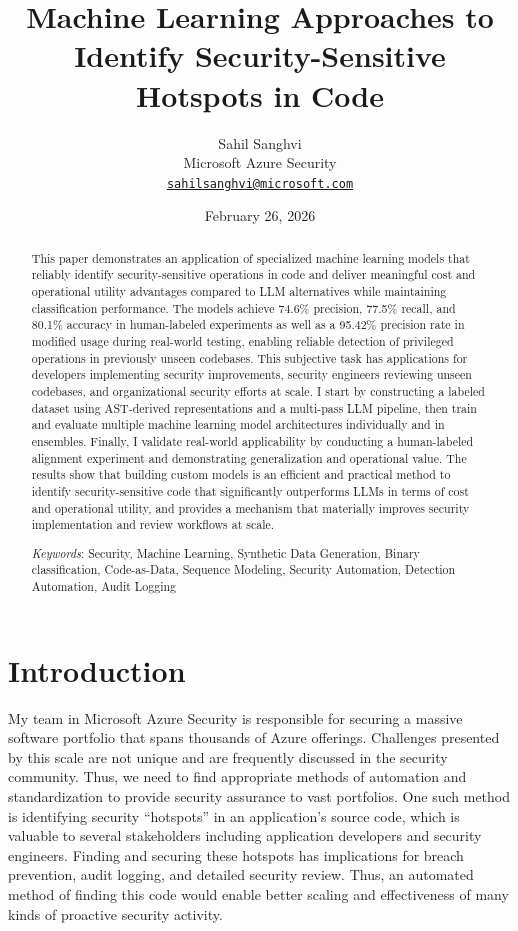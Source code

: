 \documentclass[11pt]{article}
\title{Machine Learning Approaches to Identify Security-Sensitive Hotspots in Code}
\author{
  Sahil Sanghvi\\
  {\small Microsoft Azure Security}\\
  {\small \href{mailto:sahilsanghvi@microsoft.com}{\texttt{sahilsanghvi@microsoft.com}}}
}
\date{February 26, 2026}
\begin{document}
\maketitle

\begin{abstract}

This paper demonstrates an application of specialized machine learning
models that reliably identify security-sensitive operations in code and
deliver meaningful cost and operational utility advantages compared to LLM alternatives 
while maintaining classification performance.
The models achieve 74.6\% precision, 77.5\% recall, and 80.1\%
accuracy in human-labeled experiments as well as a 95.42\% precision rate in
modified usage during real-world testing, enabling reliable detection of
privileged operations in previously unseen codebases. This subjective
task has applications for developers implementing security improvements,
security engineers reviewing unseen codebases, and organizational
security efforts at scale. I start by constructing a labeled dataset
using AST-derived representations and a multi-pass LLM pipeline, then
train and evaluate multiple machine learning model architectures
individually and in ensembles. Finally, I validate real-world
applicability by conducting a human-labeled alignment experiment and
demonstrating generalization and operational value. The results
show that building custom models is an efficient and practical method to
identify security-sensitive code that significantly outperforms LLMs in terms of
cost and operational utility, and provides a mechanism that materially improves
security implementation and review workflows at scale.

\noindent

\emph{Keywords}: Security, Machine Learning, Synthetic Data Generation,
Binary classification, Code-as-Data, Sequence Modeling, Security
Automation, Detection Automation, Audit Logging

\end{abstract}

\section{Introduction}\label{introduction}

My team in Microsoft Azure Security is responsible for securing a massive 
software portfolio that spans thousands of Azure offerings. 
Challenges presented by this scale are not unique and are frequently discussed 
in the security community. Thus, we need to find appropriate
methods of automation and standardization to provide security assurance
to vast portfolios. One such method is identifying security ``hotspots'' in
an application's source code, which is valuable to several stakeholders
including application developers and security engineers. Finding and
securing these hotspots has implications for breach prevention, audit
logging, and detailed security review. Thus, an automated method of
finding this code would enable better scaling and effectiveness of many
kinds of proactive security activity.
\end{document}
